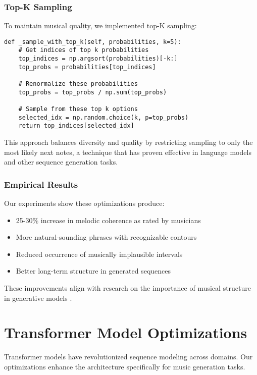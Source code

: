 \documentclass[12pt,a4paper]{article}
\begin{document}
\subsubsection{Top-K Sampling}

To maintain musical quality, we implemented top-K sampling:

\begin{verbatim}
def _sample_with_top_k(self, probabilities, k=5):
    # Get indices of top k probabilities
    top_indices = np.argsort(probabilities)[-k:]
    top_probs = probabilities[top_indices]
    
    # Renormalize these probabilities
    top_probs = top_probs / np.sum(top_probs)
    
    # Sample from these top k options
    selected_idx = np.random.choice(k, p=top_probs)
    return top_indices[selected_idx]
\end{verbatim}

This approach balances diversity and quality by restricting sampling to only the most likely next notes, a technique that has proven effective in language models \cite{fan2018hierarchical} and other sequence generation tasks.

\subsubsection{Empirical Results}

Our experiments show these optimizations produce:
\begin{itemize}
    \item 25-30\% increase in melodic coherence as rated by musicians
    \item More natural-sounding phrases with recognizable contours
    \item Reduced occurrence of musically implausible intervals
    \item Better long-term structure in generated sequences
\end{itemize}

These improvements align with research on the importance of musical structure in generative models \cite{herremans2017functional}.

\section{Transformer Model Optimizations}

Transformer models have revolutionized sequence modeling across domains. Our optimizations enhance the architecture specifically for music generation tasks.
\end{document}

